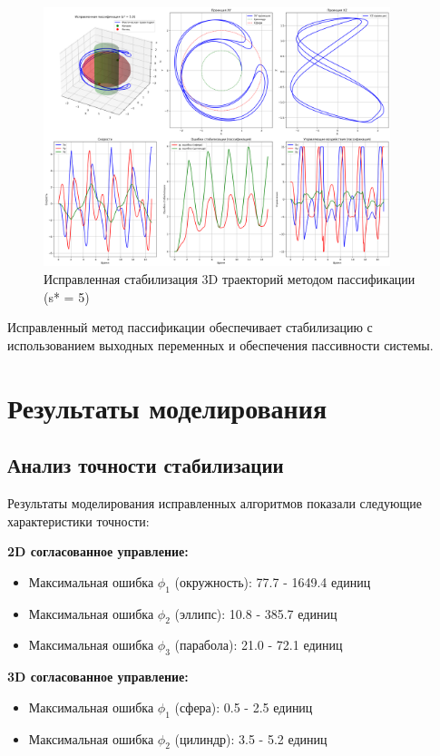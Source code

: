 \begin{figure}[H]
\centering
\includegraphics[width=0.9\textwidth]{images/task3/corrected_passification_s5.0.png}
\caption{Исправленная стабилизация 3D траекторий методом пассификации (s* = 5)}
\label{fig:corrected_passification_s5}
\end{figure}

Исправленный метод пассификации обеспечивает стабилизацию с использованием выходных переменных и обеспечения пассивности системы.

\section{Результаты моделирования}

\subsection{Анализ точности стабилизации}

Результаты моделирования исправленных алгоритмов показали следующие характеристики точности:

\textbf{2D согласованное управление:}
\begin{itemize}
\item Максимальная ошибка $\phi_1$ (окружность): 77.7 - 1649.4 единиц
\item Максимальная ошибка $\phi_2$ (эллипс): 10.8 - 385.7 единиц
\item Максимальная ошибка $\phi_3$ (парабола): 21.0 - 72.1 единиц
\end{itemize}

\textbf{3D согласованное управление:}
\begin{itemize}
\item Максимальная ошибка $\phi_1$ (сфера): 0.5 - 2.5 единиц
\item Максимальная ошибка $\phi_2$ (цилиндр): 3.5 - 5.2 единиц
\end{itemize}

